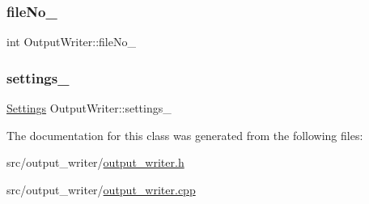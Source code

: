 \subsubsection{\texorpdfstring{fileNo\_}{fileNo\_}}
{\footnotesize\ttfamily int Output\+Writer\+::file\+No\+\_\+\hspace{0.3cm}{\ttfamily [protected]}}

\mbox{\label{classOutputWriter_a71372511003897a3c29d0e80cfbb12be}} 
\subsubsection{\texorpdfstring{settings\_}{settings\_}}
{\footnotesize\ttfamily \mbox{\hyperlink{structSettings}{Settings}} Output\+Writer\+::settings\+\_\+\hspace{0.3cm}{\ttfamily [protected]}}



The documentation for this class was generated from the following files\+:\begin{DoxyCompactItemize}
\item 
src/output\+\_\+writer/\mbox{\hyperlink{output__writer_8h}{output\+\_\+writer.\+h}}\item 
src/output\+\_\+writer/\mbox{\hyperlink{output__writer_8cpp}{output\+\_\+writer.\+cpp}}\end{DoxyCompactItemize}
